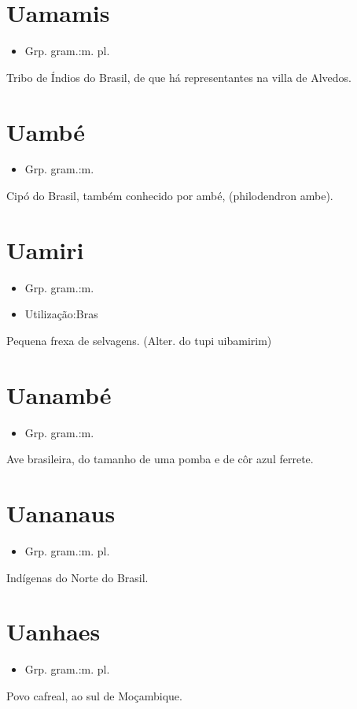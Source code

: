 \documentclass{article}
\begin{document}
\section{Uamamis}
\begin{itemize}
\item {Grp. gram.:m. pl.}
\end{itemize}
Tribo de Índios do Brasil, de que há representantes na villa de Alvedos.
\section{Uambé}
\begin{itemize}
\item {Grp. gram.:m.}
\end{itemize}
Cipó do Brasil, também conhecido por \textunderscore ambé\textunderscore , (\textunderscore philodendron ambe\textunderscore ).
\section{Uamiri}
\begin{itemize}
\item {Grp. gram.:m.}
\end{itemize}
\begin{itemize}
\item {Utilização:Bras}
\end{itemize}
Pequena frexa de selvagens.
(Alter. do tupi \textunderscore uibamirim\textunderscore )
\section{Uanambé}
\begin{itemize}
\item {Grp. gram.:m.}
\end{itemize}
Ave brasileira, do tamanho de uma pomba e de côr azul ferrete.
\section{Uananaus}
\begin{itemize}
\item {Grp. gram.:m. pl.}
\end{itemize}
Indígenas do Norte do Brasil.
\section{Uanhaes}
\begin{itemize}
\item {Grp. gram.:m. pl.}
\end{itemize}
Povo cafreal, ao sul de Moçambique.
\end{document}
